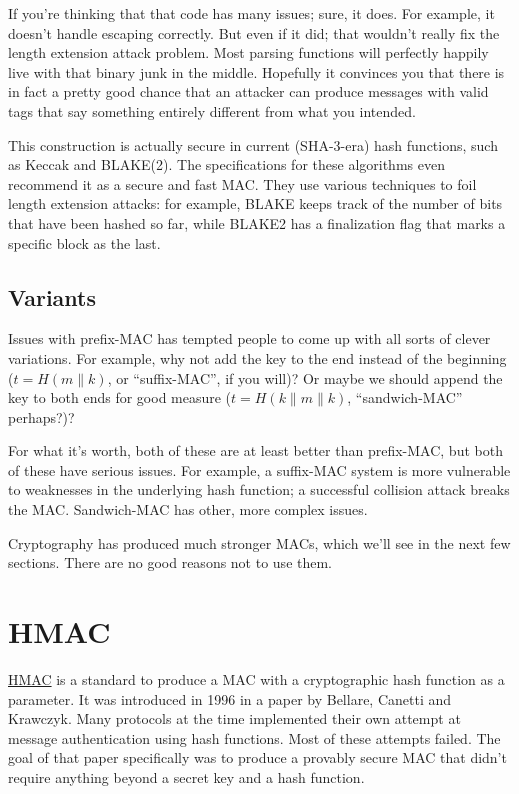 \documentclass[11pt,ebook,table,dvipsnames]{memoir}
\begin{document}
If you're thinking that that code has many issues; sure, it does. For
example, it doesn't handle escaping correctly. But even if it did;
that wouldn't really fix the length extension attack problem. Most
parsing functions will perfectly happily live with that binary junk in
the middle. Hopefully it convinces you that there is in fact a pretty
good chance that an attacker can produce messages with valid tags that
say something entirely different from what you intended.

This construction is actually secure in current (SHA-3-era) hash
functions, such as Keccak and BLAKE(2). The specifications for these
algorithms even recommend it as a secure and fast MAC. They use
various techniques to foil length extension attacks: for example,
BLAKE keeps track of the number of bits that have been hashed so far,
while BLAKE2 has a finalization flag that marks a specific block as
the last.
\subsection{Variants}
\label{sec-2-7-3-2}

Issues with prefix-MAC has tempted people to come up with all sorts of
clever variations. For example, why not add the key to the end instead
of the beginning ($t = H(m \| k)$, or \enquote{suffix-MAC}, if you will)? Or
maybe we should append the key to both ends for good measure ($t = H(k
\| m \| k)$, \enquote{sandwich-MAC} perhaps?)?

For what it's worth, both of these are at least better than
prefix-MAC, but both of these have serious issues. For example, a
suffix-MAC system is more vulnerable to weaknesses in the underlying
hash function; a successful collision attack breaks the MAC.
Sandwich-MAC has other, more complex issues.

Cryptography has produced much stronger MACs, which we'll see in the
next few sections. There are no good reasons not to use them.
\section{\label{HMAC}HMAC}
\label{sec-2-7-4}

\hyperref[HMAC]{HMAC} is a standard to produce a MAC with a cryptographic hash function
as a parameter. It was introduced in 1996 in a paper by Bellare,
Canetti and Krawczyk. Many protocols at the time implemented their own
attempt at message authentication using hash functions. Most of these
attempts failed. The goal of that paper specifically was to produce a
provably secure MAC that didn't require anything beyond a secret key
and a hash function.
\end{document}
